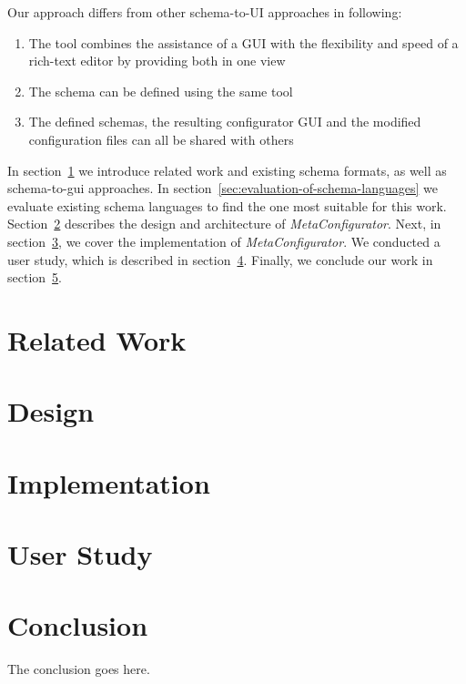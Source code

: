 \documentclass[lettersize,journal]{IEEEtran}
\newcommand{\toolname}{\textit{MetaConfigurator}} %
\begin{document}
 Our approach differs from other schema-to-UI approaches in following:

 \begin{enumerate}
  \item The tool combines the assistance of a GUI with the flexibility and speed of a rich-text editor by providing both in one view
  \item The schema can be defined using the same tool
  \item The defined schemas, the resulting configurator GUI and the modified configuration files can all be shared with others
 \end{enumerate}


 In section~\ref{sec:research} we introduce related work and existing schema formats, as well as schema-to-gui approaches.
 In section~\ref{sec:evaluation-of-schema-languages} we evaluate existing schema languages to find the one most suitable for this work.
 Section~\ref{sec:design} describes the design and architecture of \toolname{}.
 Next, in section~\ref{sec:implementation}, we cover the implementation of \toolname{}.
 We conducted a user study, which is described in section~\ref{sec:user_study}.
 Finally, we conclude our work in section~\ref{sec:conclusion}.


 \section{Related Work}\label{sec:research}
 


 \section{Design}\label{sec:design}
 


 \section{Implementation}\label{sec:implementation}
 

 \section{User Study}\label{sec:user_study}
 


 \section{Conclusion}\label{sec:conclusion}
 The conclusion goes here.
\end{document}
